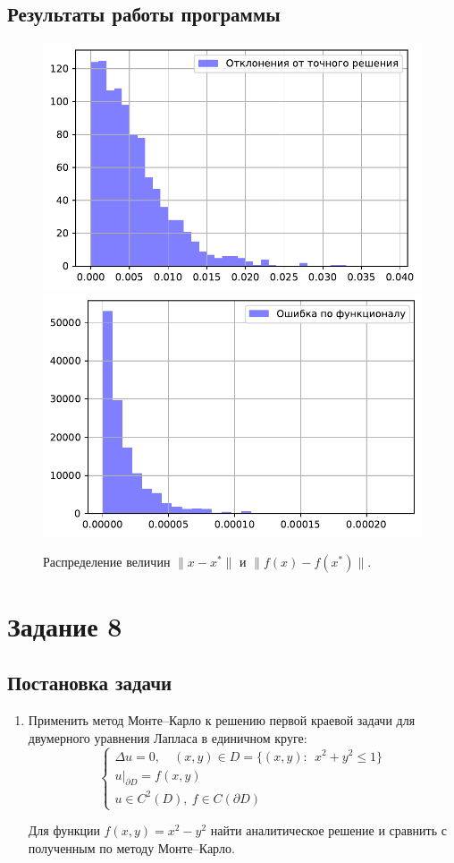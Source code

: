 \documentclass[16pt]{article}
\begin{document}
\subsection{Результаты работы программы}
\begin{figure}[h]
	\center
	\includegraphics[scale=0.5]{7_2.pdf}
	\hfill
	\includegraphics[scale=0.5]{7_3.pdf}
	\caption{Распределение величин $\|x - x^*\|$ и $\|f(x) - f(x^*)\|$.}
\end{figure}


\section{Задание 8}
\subsection{Постановка задачи}
\begin{enumerate}
	\item Применить метод Монте--Карло к решению первой краевой задачи для двумерного уравнения Лапласа в единичном круге:
$$
\begin{cases}
\Delta u = 0, \quad (x, y) \in D = \{(x, y)\colon \ \ x^2 + y^2 \leq 1\}\\
u|_{\partial D} = f(x, y) \\
u \in C^2(D), \ f \in C(\partial D)
\end{cases}
$$

Для функции $f(x, y) = x^2 - y^2$ найти аналитическое решение и сравнить с полученным по методу Монте--Карло.
\end{enumerate}
\end{document}
